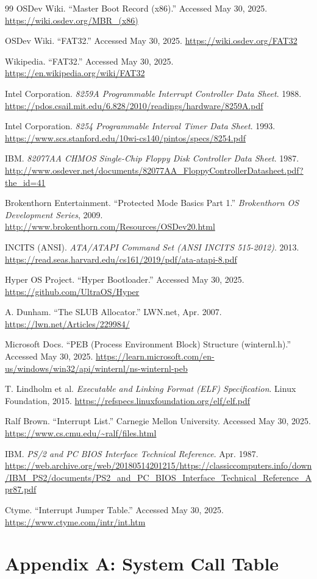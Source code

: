 \documentclass[12pt,a4paper]{report}
\begin{document}
\begin{thebibliography}{99}
		OSDev Wiki.  
		“Master Boot Record (x86).”  
		Accessed May 30, 2025.  
		\url{https://wiki.osdev.org/MBR_(x86)}
		
		OSDev Wiki.  
		“FAT32.”  
		Accessed May 30, 2025.  
		\url{https://wiki.osdev.org/FAT32}
		
		Wikipedia.  
		“FAT32.”  
		Accessed May 30, 2025.  
		\url{https://en.wikipedia.org/wiki/FAT32}
		
		Intel Corporation.  
		\textit{8259A Programmable Interrupt Controller Data Sheet}.  
		1988.  
		\url{https://pdos.csail.mit.edu/6.828/2010/readings/hardware/8259A.pdf}
		
		Intel Corporation.  
		\textit{8254 Programmable Interval Timer Data Sheet}.  
		1993.  
		\url{https://www.scs.stanford.edu/10wi-cs140/pintos/specs/8254.pdf}
		
		IBM.  
		\textit{82077AA CHMOS Single-Chip Floppy Disk Controller Data Sheet}.  
		1987.  
		\url{http://www.osdever.net/documents/82077AA_FloppyControllerDatasheet.pdf?the_id=41}
		
		Brokenthorn Entertainment.  
		“Protected Mode Basics Part 1.”  
		\textit{Brokenthorn OS Development Series}, 2009.  
		\url{http://www.brokenthorn.com/Resources/OSDev20.html}
		
		INCITS (ANSI).  
		\textit{ATA/ATAPI Command Set (ANSI INCITS 515-2012)}.  
		2013.  
		\url{https://read.seas.harvard.edu/cs161/2019/pdf/ata-atapi-8.pdf}
		
		Hyper OS Project.  
		“Hyper Bootloader.”  
		Accessed May 30, 2025.  
		\url{https://github.com/UltraOS/Hyper}
		
		A. Dunham.  
		“The SLUB Allocator.”  
		LWN.net, Apr. 2007.  
		\url{https://lwn.net/Articles/229984/}
		
		Microsoft Docs.  
		“PEB (Process Environment Block) Structure (winternl.h).”  
		Accessed May 30, 2025.  
		\url{https://learn.microsoft.com/en-us/windows/win32/api/winternl/ns-winternl-peb}
		
		T. Lindholm et al.  
		\textit{Executable and Linking Format (ELF) Specification}.  
		Linux Foundation, 2015.  
		\url{https://refspecs.linuxfoundation.org/elf/elf.pdf}
		
		Ralf Brown.  
		“Interrupt List.”  
		Carnegie Mellon University. Accessed May 30, 2025.  
		\url{https://www.cs.cmu.edu/~ralf/files.html}
		
		IBM.  
		\textit{PS/2 and PC BIOS Interface Technical Reference}.  
		Apr. 1987.  
		\url{https://web.archive.org/web/20180514201215/https://classiccomputers.info/down/IBM_PS2/documents/PS2_and_PC_BIOS_Interface_Technical_Reference_Apr87.pdf}
		
		Ctyme.  
		“Interrupt Jumper Table.”  
		Accessed May 30, 2025.  
		\url{https://www.ctyme.com/intr/int.htm}
		
	\end{thebibliography}
	
	\appendix
	\chapter{Appendix A: System Call Table}
	
\end{document}
